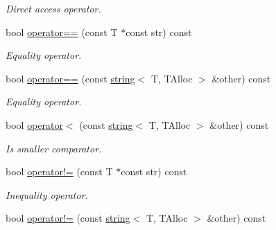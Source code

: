 \begin{DoxyCompactItemize}
\begin{DoxyCompactList}\small\item\em Direct access operator. \end{DoxyCompactList}\item 
bool \hyperlink{classirr_1_1core_1_1string_a71c6fdf182a1420c7ca7186e22fa71cc}{operator==} (const T $\ast$const str) const \hypertarget{classirr_1_1core_1_1string_a71c6fdf182a1420c7ca7186e22fa71cc}{}\label{classirr_1_1core_1_1string_a71c6fdf182a1420c7ca7186e22fa71cc}

\begin{DoxyCompactList}\small\item\em Equality operator. \end{DoxyCompactList}\item 
bool \hyperlink{classirr_1_1core_1_1string_a20402605668559f43ebd5eab486d46ca}{operator==} (const \hyperlink{classirr_1_1core_1_1string}{string}$<$ T, T\+Alloc $>$ \&other) const \hypertarget{classirr_1_1core_1_1string_a20402605668559f43ebd5eab486d46ca}{}\label{classirr_1_1core_1_1string_a20402605668559f43ebd5eab486d46ca}

\begin{DoxyCompactList}\small\item\em Equality operator. \end{DoxyCompactList}\item 
bool \hyperlink{classirr_1_1core_1_1string_a6893220181667b95a9ed7281bbce2601}{operator$<$} (const \hyperlink{classirr_1_1core_1_1string}{string}$<$ T, T\+Alloc $>$ \&other) const \hypertarget{classirr_1_1core_1_1string_a6893220181667b95a9ed7281bbce2601}{}\label{classirr_1_1core_1_1string_a6893220181667b95a9ed7281bbce2601}

\begin{DoxyCompactList}\small\item\em Is smaller comparator. \end{DoxyCompactList}\item 
bool \hyperlink{classirr_1_1core_1_1string_aee3f3f2b8ea3859a77b5722c8c8e51f0}{operator!=} (const T $\ast$const str) const \hypertarget{classirr_1_1core_1_1string_aee3f3f2b8ea3859a77b5722c8c8e51f0}{}\label{classirr_1_1core_1_1string_aee3f3f2b8ea3859a77b5722c8c8e51f0}

\begin{DoxyCompactList}\small\item\em Inequality operator. \end{DoxyCompactList}\item 
bool \hyperlink{classirr_1_1core_1_1string_af9445c6685f611f139a3fce9e841e456}{operator!=} (const \hyperlink{classirr_1_1core_1_1string}{string}$<$ T, T\+Alloc $>$ \&other) const \hypertarget{classirr_1_1core_1_1string_af9445c6685f611f139a3fce9e841e456}{}\label{classirr_1_1core_1_1string_af9445c6685f611f139a3fce9e841e456}


\end{DoxyCompactItemize}
